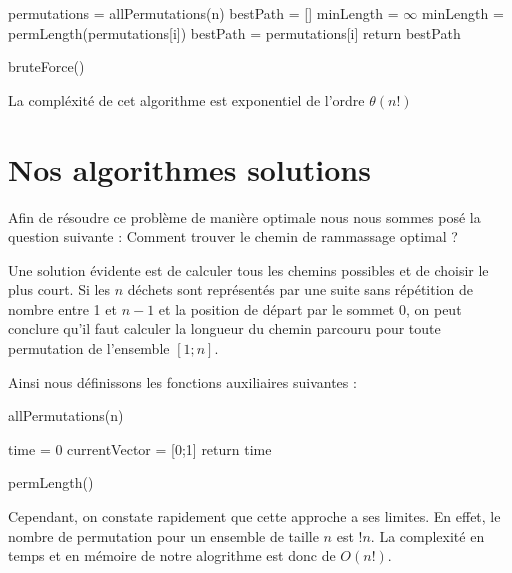 \documentclass{report}
\begin{document}
  \begin{algorithm}[H]
    \SetAlgoLined
    permutations = allPermutations(n)\;
    bestPath = []\;
    minLength = $\infty$ \;
    {
        {
            minLength = permLength(permutations[i])\;
            bestPath = permutations[i]\;
        }
    }
    return bestPath\;
    \caption{bruteForce()}
  \end{algorithm}

  La compl\'exit\'e de cet algorithme est exponentiel de l'ordre $\theta(n!)$



\section{Nos algorithmes solutions}

Afin de résoudre ce problème de manière optimale nous nous sommes posé la question suivante : Comment trouver le chemin de rammassage optimal ?

Une solution évidente est de calculer tous les chemins possibles et de choisir le plus court. Si les $n$ déchets sont représentés par une suite sans répétition de nombre entre 1 et $n - 1$ et la position de départ par le sommet 0, on peut conclure qu'il faut calculer la longueur du chemin parcouru pour toute permutation de l'ensemble $[1 ; n]$.

Ainsi nous définissons les fonctions auxiliaires suivantes : \\

\begin{algorithm}[H]
  \SetAlgoLined
  \caption{allPermutations(n)}
\end{algorithm}

\begin{algorithm}[H]
    \SetAlgoLined
    time = 0\;
    currentVector = [0;1]\;
    return time\;
    \caption{permLength()}
  \end{algorithm}


  Cependant, on constate rapidement que cette approche a ses limites. En effet, le nombre de permutation pour un ensemble de taille $n$ est $!n$. La complexité en temps et en mémoire de notre alogrithme est donc de $O(n!)$.
\end{document}
